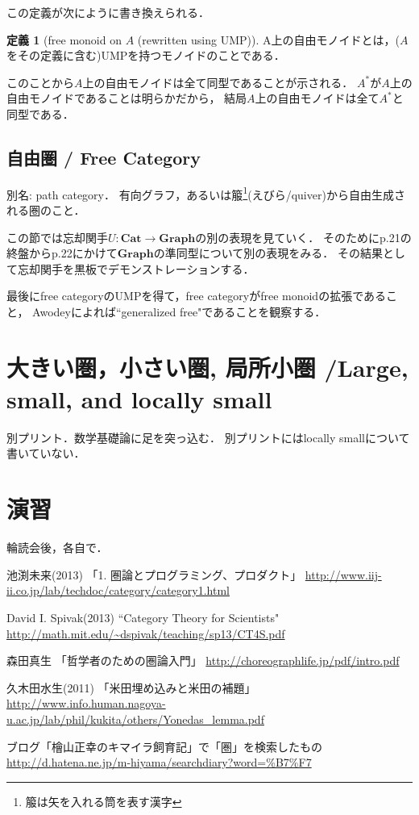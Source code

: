 \documentclass[a4j]{jarticle}
\newcommand {\cat}[1]{%
\mathbf{#1}%
}
\theoremstyle{definition}
\newtheorem{definition}[theorem]{定義}
\begin{document}
            この定義が次にように書き換えられる．

            \begin{definition}[free monoid on $A$ (rewritten using UMP)]
                A上の自由モノイドとは，($A$をその定義に含む)UMPを持つモノイドのことである．
            \end{definition}

            このことから$A$上の自由モノイドは全て同型であることが示される．
            $A^{*}$が$A$上の自由モノイドであることは明らかだから，
            結局$A$上の自由モノイドは全て$A^{*}$と同型である．

        \subsection{自由圏 / Free Category}
            別名: path category．
            有向グラフ，あるいは箙\footnote{箙は矢を入れる筒を表す漢字}(えびら/quiver)から自由生成される圏のこと．

            この節では忘却関手$U: \cat{Cat} \rightarrow \cat{Graph}$の別の表現を見ていく．
            そのためにp.21の終盤からp.22にかけて$\cat{Graph}$の準同型について別の表現をみる．
            その結果として忘却関手を黒板でデモンストレーションする．

            最後にfree categoryのUMPを得て，free categoryがfree monoidの拡張であること，
            Awodeyによれば``generalized free"であることを観察する．

    \section{大きい圏，小さい圏, 局所小圏 /Large, small, and locally small}
        別プリント．数学基礎論に足を突っ込む．
        別プリントにはlocally smallについて書いていない．

    \section{演習}
        輪読会後，各自で．

\begin{thebibliography}{99}
     池渕未来(2013)
        「1. 圏論とプログラミング、プロダクト」
        \url{http://www.iij-ii.co.jp/lab/techdoc/category/category1.html}

     David I. Spivak(2013)
        ``Category Theory for Scientists"
        \url{http://math.mit.edu/~dspivak/teaching/sp13/CT4S.pdf} %

     森田真生
        「哲学者のための圏論入門」
        \url{http://choreographlife.jp/pdf/intro.pdf}

     久木田水生(2011)
        「米田埋め込みと米田の補題」
        \url{http://www.info.human.nagoya-u.ac.jp/lab/phil/kukita/others/Yonedas_lemma.pdf}

        ブログ「檜山正幸のキマイラ飼育記」で「圏」を検索したもの
        \url{http://d.hatena.ne.jp/m-hiyama/searchdiary?word=%B7%F7}

\end{thebibliography}
\end{document}

